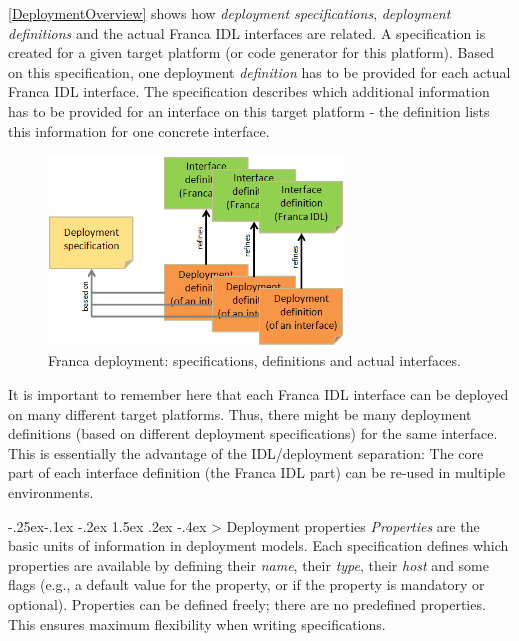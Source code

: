 \documentclass[a4paper,10pt]{scrreprt}
\makeatletter
\renewcommand\subsection{\medskip\@startsection{subsection}{2}{\z@}%
  {-.25ex\@plus -.1ex \@minus -.2ex}%
  {1.5ex \@plus .2ex \@minus -.4ex}%
  {\ifnum \scr@compatibility>\@nameuse{scr@v@2.96}\relax
    \setlength{\parfillskip}{\z@ plus 1fil}\fi
    \raggedsection\normalfont\sectfont\nobreak\size@subsection
  }%
}
\makeatother
\begin{document}
\autoref{DeploymentOverview} shows how \textit{deployment specifications}, \textit{deployment definitions} and
the actual Franca IDL interfaces are related. A specification is created for a given target
platform (or code generator for this platform). Based on this specification, one deployment
\textit{definition} has to be provided for each actual Franca IDL interface. The specification
describes which additional information has to be provided for an interface on this target
platform - the definition lists this information for one concrete interface.
  
\begin{figure}[!ht]
\centering
\includegraphics[width=0.70\textwidth]{images/franca_deployment_interfaces.png}
\caption{Franca deployment: specifications, definitions and actual interfaces.}
\label{DeploymentOverview}
\end{figure}

It is important to remember here that each Franca IDL interface can be deployed on 
many different target platforms. Thus, there might be many deployment definitions
(based on different deployment specifications) for the same interface. This is essentially
the advantage of the IDL/deployment separation: The core part of each interface definition
(the Franca IDL part) can be re-used in multiple environments.

\subsection{Deployment properties}
\label{DeploymentModels_Concepts_Properties}
\textit{Properties} are the basic units of information in deployment models.
Each specification defines which properties are available by defining their \textit{name},
their \textit{type}, their \textit{host} and some flags (e.g., a default value for the property, or
if the property is mandatory or optional). Properties can be defined freely; there
are no predefined properties. This ensures maximum flexibility when writing specifications.
\end{document}
